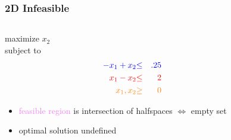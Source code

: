\documentclass{beamer}
\begin{document}
\begin{frame} \frametitle{2D Infeasible}
  \begin{columns}
    \begin{column}{0.4 \textwidth}
  maximize $x_2$ \\
  subject to
  \begin{eqnarray*}
    \textcolor{blue}{-x_1 + x_2} &\textcolor{blue}{\leq}& \textcolor{blue}{.25} \\
    \textcolor{red}{x_1 - x_2} &\textcolor{red}{\leq}& \textcolor{red}{2} \\
    \textcolor{orange}{x_1, x_2} &\textcolor{orange}{\geq}& \textcolor{orange}{0}
  \end{eqnarray*}
  \begin{itemize}
    \item \textcolor{violet}{feasible region} is intersection of halfspaces
     $\Leftrightarrow$ empty set
    \item optimal solution undefined
  \end{itemize}
  \end{column}
  \begin{column}{0.6 \textwidth}
    \begin{center}
  \end{center}
\end{column}
\end{columns}
\end{frame}
\end{document}
